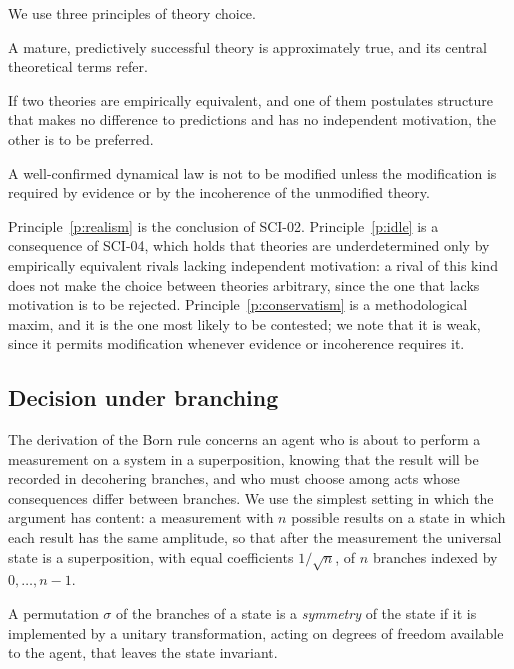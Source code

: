 \documentclass{situationist-preprint}
\begin{document}
We use three principles of theory choice.

\begin{principle}[Realism]\label{p:realism}
A mature, predictively successful theory is approximately true, and its central theoretical terms refer.
\end{principle}

\begin{principle}\label{p:idle}
If two theories are empirically equivalent, and one of them postulates structure that makes no difference to predictions and has no independent motivation, the other is to be preferred.
\end{principle}

\begin{principle}\label{p:conservatism}
A well-confirmed dynamical law is not to be modified unless the modification is required by evidence or by the incoherence of the unmodified theory.
\end{principle}

Principle~\ref{p:realism} is the conclusion of SCI-02. Principle~\ref{p:idle} is a consequence of SCI-04, which holds that theories are underdetermined only by empirically equivalent rivals lacking independent motivation: a rival of this kind does not make the choice between theories arbitrary, since the one that lacks motivation is to be rejected. Principle~\ref{p:conservatism} is a methodological maxim, and it is the one most likely to be contested; we note that it is weak, since it permits modification whenever evidence or incoherence requires it.

\subsection{Decision under branching}

The derivation of the Born rule concerns an agent who is about to perform a measurement on a system in a superposition, knowing that the result will be recorded in decohering branches, and who must choose among acts whose consequences differ between branches. We use the simplest setting in which the argument has content: a measurement with $n$ possible results on a state in which each result has the same amplitude, so that after the measurement the universal state is a superposition, with equal coefficients $1/\sqrt{n}$, of $n$ branches indexed by $0,\dots,n-1$.

\begin{definition}\label{d:symmetry}
A permutation $\sigma$ of the branches of a state is a \emph{symmetry} of the state if it is implemented by a unitary transformation, acting on degrees of freedom available to the agent, that leaves the state invariant.
\end{definition}
\end{document}
